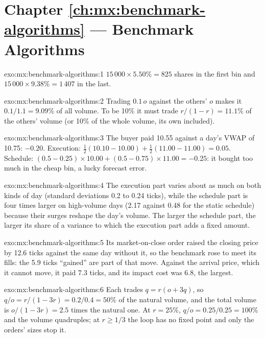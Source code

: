 \section*{Chapter \ref{ch:mx:benchmark-algorithms} --- Benchmark Algorithms}

\begin{solution}{exo:mx:benchmark-algorithms:1}
$15\,000\times5.50\%=825$ shares in the first bin and $15\,000\times9.38\%=1\,407$ in the last.
\end{solution}

\begin{solution}{exo:mx:benchmark-algorithms:2}
Trading $0.1\,o$ against the others' $o$ makes it $0.1/1.1=9.09\%$ of all volume. To be 10\% it must trade $r/(1-r)=11.1\%$ of the others' volume
(or 10\% of the whole volume, its own included).
\end{solution}

\begin{solution}{exo:mx:benchmark-algorithms:3}
The buyer paid 10.55 against a day's VWAP of 10.75: $-0.20$. Execution: $\tfrac12(10.10-10.00)+\tfrac12(11.00-11.00)=0.05$. Schedule:
$(0.5-0.25)\times10.00+(0.5-0.75)\times11.00=-0.25$: it bought too much in the cheap bin, a lucky forecast error.
\end{solution}

\begin{solution}{exo:mx:benchmark-algorithms:4}
The execution part varies about as much on both kinds of day (standard deviations 0.2 to 0.24 ticks), while the schedule part is four times larger
on high-volume days (2.17 against 0.48 for the static schedule) because their surges reshape the day's volume. The larger the schedule part, the larger
its share of a variance to which the execution part adds a fixed amount.
\end{solution}

\begin{solution}{exo:mx:benchmark-algorithms:5}
Its market-on-close order raised the closing price by 12.6 ticks against the same day without it, so the benchmark rose to meet its fills: the 5.9
ticks ``gained'' are part of that move. Against the arrival price, which it cannot move, it paid 7.3 ticks, and its impact cost was 6.8, the largest.
\end{solution}

\begin{solution}{exo:mx:benchmark-algorithms:6}
Each trades $q=r(o+3q)$, so $q/o=r/(1-3r)=0.2/0.4=50\%$ of the natural volume, and the total volume is $o/(1-3r)=2.5$ times the natural one. At
$r=25\%$, $q/o=0.25/0.25=100\%$ and the volume quadruples; at $r\ge1/3$ the loop has no fixed point and only the orders' sizes stop it.
\end{solution}

